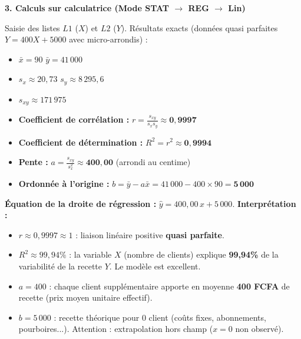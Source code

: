 \documentclass[11pt]{article}
\begin{document}
\begin{exoresolu}
\textbf{3. Calculs sur calculatrice (Mode STAT $\to$ REG $\to$ Lin)}\par
Saisie des listes $L1$ ($X$) et $L2$ ($Y$).
Résultats exacts (données quasi parfaites $Y = 400X + 5000$ avec micro-arrondis) :
\begin{itemize}
    \item $\bar{x} = 90$ \quad $\bar{y} = 41\,000$
    \item $s_x \approx 20,73$ \quad $s_y \approx 8\,295,6$
    \item $s_{xy} \approx 171\,975$
    \item \textbf{Coefficient de corrélation :} $r = \frac{s_{xy}}{s_x s_y} \approx \mathbf{0,9997}$
    \item \textbf{Coefficient de détermination :} $R^2 = r^2 \approx \mathbf{0,9994}$
    \item \textbf{Pente :} $a = \frac{s_{xy}}{s_x^2} \approx \mathbf{400,00}$ (arrondi au centime)
    \item \textbf{Ordonnée à l'origine :} $b = \bar{y} - a\bar{x} = 41\,000 - 400 \times 90 = \mathbf{5\,000}$
\end{itemize}
\textbf{Équation de la droite de régression :} $\boxed{\hat{y} = 400,00\,x + 5\,000}$.
\textbf{Interprétation :}
\begin{itemize}
    \item $r \approx 0,9997 \approx 1$ : liaison linéaire positive \textbf{quasi parfaite}.
    \item $R^2 \approx 99,94\%$ : la variable $X$ (nombre de clients) explique \textbf{99,94\%} de la variabilité de la recette $Y$. Le modèle est excellent.
    \item $a = 400$ : chaque client supplémentaire apporte en moyenne \textbf{400 FCFA} de recette (prix moyen unitaire effectif).
    \item $b = 5\,000$ : recette théorique pour 0 client (coûts fixes, abonnements, pourboires...). Attention : extrapolation hors champ ($x=0$ non observé).
\end{itemize}


\end{exoresolu}
\end{document}
